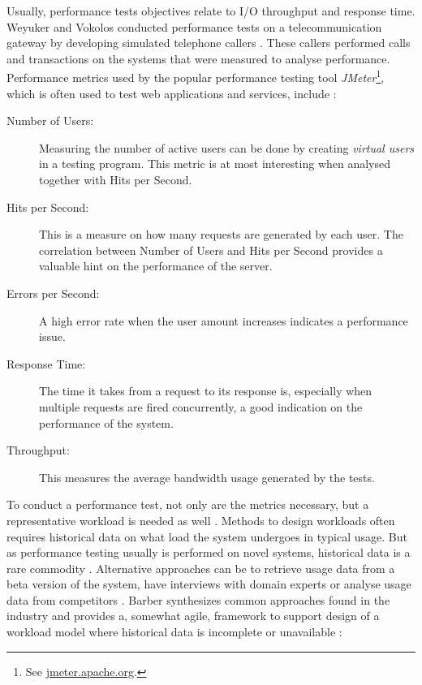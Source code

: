 Usually, performance tests objectives relate to I/O throughput and response
time. Weyuker and Vokolos conducted performance tests on a telecommunication
gateway by developing simulated telephone callers \cite{weyuker2000experience}.
These callers performed calls and transactions on the systems that were
measured to analyse performance. Performance metrics used by the popular
performance testing tool \textit{JMeter}\footnote{See
\url{jmeter.apache.org}.}, which is often used to test web applications and
services, include \cite{mendelawy2016kpis}:

\begin{description}
  \item[Number of Users:] Measuring the number of active users can be done by
    creating \textit{virtual users} in a testing program. This metric is at
    most interesting when analysed together with Hits per Second.
  \item[Hits per Second:] This is a measure on how many requests are generated
    by each user. The correlation between Number of Users and Hits per Second
    provides a valuable hint on the performance of the server.
  \item[Errors per Second:] A high error rate when the user amount increases
    indicates a performance issue.
  \item[Response Time:] The time it takes from a request to its response is,
    especially when multiple requests are fired concurrently, a good indication
    on the performance of the system.
  \item[Throughput:] This measures the average bandwidth usage generated by the
    tests.
\end{description}

To conduct a performance test, not only are the metrics necessary, but a
representative workload is needed as well \cite{weyuker2000experience}.
Methods to design workloads often requires historical data on what load the
system undergoes in typical usage. But as performance testing usually is
performed on novel systems, historical data is a rare commodity
\cite{barber2004creating}. Alternative approaches can be to retrieve usage data
from a beta version of the system, have interviews with domain experts or
analyse usage data from competitors \cite{jiang2015survey}. Barber synthesizes
common approaches found in the industry and provides a, somewhat agile,
framework to support design of a workload model where historical data is
incomplete or unavailable \cite{barber2004creating}:

